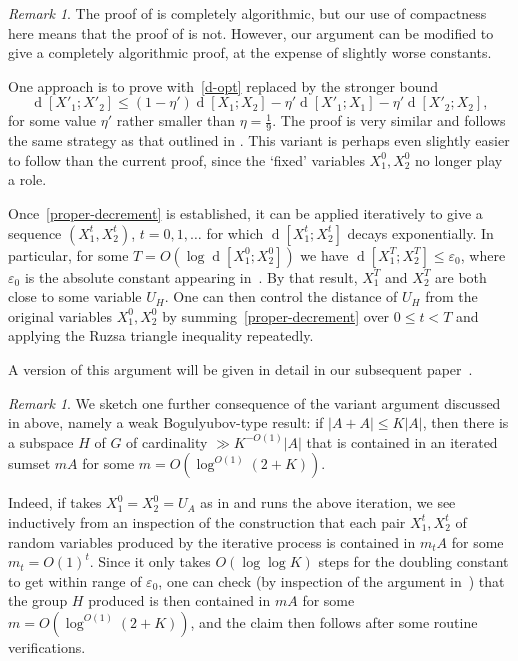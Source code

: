 \documentclass[12pt,reqno,tbtags]{amsart}
\theoremstyle{definition}
\theoremstyle{remark}
\newtheorem{remark}[theorem]{Remark}
\renewcommand{\leq}{\leqslant}
\def\eps{\varepsilon}
\newcommand{\dist}[2]{{\operatorname{d}[#1;#2]}} %
\numberwithin{equation}{section}
\begin{document}
\begin{remark}\label{quant}
  The proof of  is completely algorithmic, but our use of compactness here means that the proof of  is not.
  However, our argument can be modified to give a completely algorithmic proof, at the expense of slightly worse constants.

  One approach is to prove  with~\eqref{d-opt} replaced by the stronger bound
  \begin{equation}\label{proper-decrement}
    \dist{X'_1}{X'_2} \leq (1 - \eta') \dist{X_1}{X_2} - \eta' \dist{X'_1}{X_1} - \eta' \dist{X'_2}{X_2},
  \end{equation}
  for some value $\eta'$ rather smaller than $\eta=\frac{1}{9}$.
  The proof is very similar and follows the same strategy as that outlined in .
  This variant is perhaps even slightly easier to follow than the current proof, since the `fixed' variables $X_1^0, X_2^0$ no longer play a role.

  Once~\eqref{proper-decrement} is established, it can be applied iteratively  to give a sequence $(X_1^{t}, X_2^{t})$, $t = 0,1,\dots$ for which $\dist{X_1^{t}}{X_2^{t}}$ decays exponentially.
  In particular, for some $T = O(\log \dist{X^0_1}{X^0_2})$ we have $\dist{X_1^{T}}{X_2^{T}} \leq \eps_0$, where $\eps_0$ is the absolute constant appearing in~\cite[Proposition 1.3]{gmt}.
  By that result, $X_1^{T}$ and $X_2^{T}$ are both close to some variable $U_H$. One can then control the distance of $U_H$ from the original variables $X^0_1, X^0_2$ by summing~\eqref{proper-decrement} over $0 \leq t < T$ and applying the Ruzsa triangle inequality repeatedly.

  A version of this argument will be given in detail in our subsequent paper~\cite{ggmt-pfr-odd}.
\end{remark}
\begin{remark}\label{bog-remark}
   We sketch one further consequence of the variant argument discussed in  above, namely a weak Bogulyubov-type result: if $|A+A| \leq K|A|$, then there is a subspace $H$ of $G$ of cardinality $\gg K^{-O(1)} |A|$ that is contained in an iterated sumset $mA$ for some $m = O(\log^{O(1)}(2+K))$.

  Indeed, if takes $X^0_1 = X^0_2 = U_A$ as in  and runs the above iteration, we see inductively from an inspection of the construction that each pair $X_1^t, X_2^t$ of random variables produced by the iterative process is contained in $m_t A$ for some $m_t = O(1)^t$.  Since it only takes $O(\log\log K)$ steps for the doubling constant to get within range of $\eps_0$, one can check (by inspection of the argument in~\cite[Proposition 1.3]{gmt}) that the group $H$ produced is then contained in $mA$ for some $m = O(\log^{O(1)}(2+K))$, and the claim then follows after some routine verifications.
\end{remark}
\end{document}
